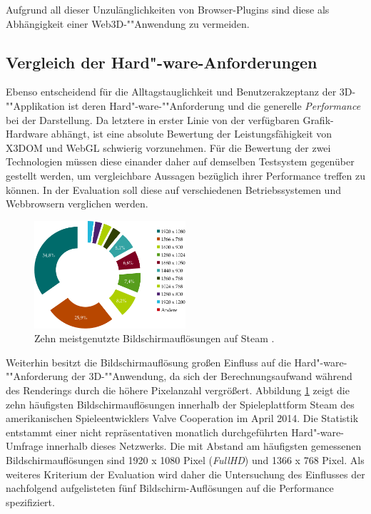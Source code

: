 Aufgrund all dieser Unzulänglichkeiten von Browser-Plugins sind diese als Abhängigkeit einer Web3D-""Anwendung zu vermeiden.

\subsection{Vergleich der Hard"-ware-Anforderungen}
\label{SECTION:HARDWARE_REQUIREMENTS}

Ebenso entscheidend für die Alltagstauglichkeit und Benutzerakzeptanz der 3D-""Applikation ist deren Hard"-ware-""Anforderung und die generelle \emph{Performance} bei der Darstellung. Da letztere in erster Linie von der verfügbaren Grafik-Hardware abhängt, ist eine absolute Bewertung der Leistungsfähigkeit von X3DOM und WebGL schwierig vorzunehmen. Für die Bewertung der zwei Technologien müssen diese einander daher auf demselben Testsystem gegenüber gestellt werden, um vergleichbare Aussagen bezüglich ihrer Performance treffen zu können. In der Evaluation soll diese auf verschiedenen Betriebssystemen und Webbrowsern verglichen werden.

\begin{figure}[!h]
	\centering
	\includegraphics[width=0.5\textwidth]{kap3/figures/hw-top-ten-resolutions-steam-crop.pdf}
	\caption{Zehn meistgenutzte Bildschirmauflösungen auf Steam \autocite{STEAM_HARDWARE_SURVERY}.}
	\label{STEAM_HW_RESOLUTIONS}
\end{figure}

Weiterhin besitzt die Bildschirmauflösung großen Einfluss auf die Hard"-ware-""Anforderung der 3D-""Anwendung, da sich der Berechnungsaufwand während des Renderings durch die höhere Pixelanzahl vergrößert. Abbildung \ref{STEAM_HW_RESOLUTIONS} zeigt die zehn häufigsten Bildschirmauflösungen innerhalb der Spieleplattform Steam des amerikanischen Spieleentwicklers Valve Cooperation im April 2014. Die Statistik entstammt einer nicht repräsentativen monatlich durchgeführten Hard"-ware-Umfrage innerhalb dieses Netzwerks. Die mit Abstand am häufigsten gemessenen Bildschirmauflösungen sind 1920 x 1080 Pixel (\emph{FullHD}) und 1366 x 768 Pixel. Als weiteres Kriterium der Evaluation wird daher die Untersuchung des Einflusses der nachfolgend aufgelisteten fünf Bildschirm-Auflösungen auf die Performance spezifiziert.

